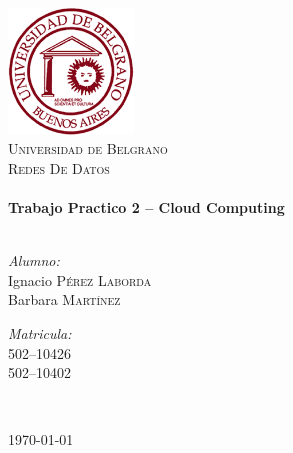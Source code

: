 \begin{titlepage}

\begin{center}

\includegraphics[width=0.25\textwidth]{./logo_UB.png}\\[1cm] 

\textsc{\LARGE Universidad de Belgrano}\\[1.5cm]

\textsc{\Large Redes De Datos}\\[0.5cm]

\HRule \\[0.4cm]
{ \huge \bfseries Trabajo Practico 2 -- Cloud Computing}\\[0.4cm]
\HRule \\[1.5cm]

\begin{minipage}{0.4\textwidth}
\begin{flushleft} \large
\emph{Alumno:}\\
Ignacio \textsc{P\'erez Laborda}\\
Barbara \textsc{Mart\'inez}\\
\end{flushleft}
\end{minipage}
\begin{minipage}{0.4\textwidth}
\begin{flushright} \large
\emph{Matricula:} \\
502--10426\\
502--10402\\
\end{flushright}
\end{minipage}\\[1.5cm]

\vfill

{\large \today}

\end{center}

\end{titlepage}
